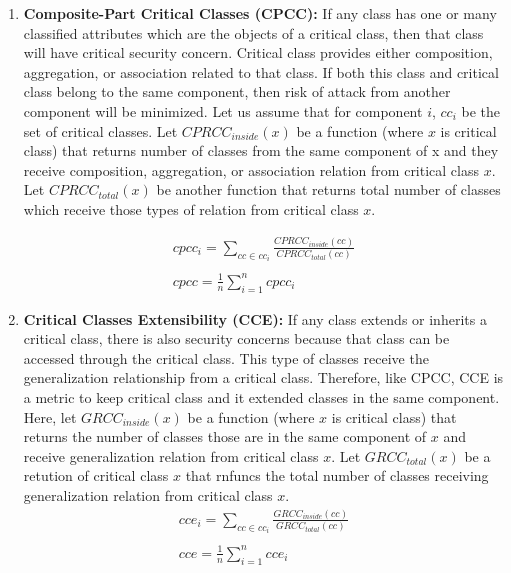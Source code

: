 \documentclass[letterpaper, 10 pt, conference]{ieeeconf}  %
\begin{document}
\begin{enumerate}
\item \textbf{Composite-Part Critical Classes (CPCC):} If any class has one or many classified attributes which are the objects of a critical class, then that class will have critical security concern. Critical class provides either composition, aggregation, or association related to that class. If both this class and critical class belong to the same component, then risk of attack from another component will be minimized. Let us assume that for component $i$, $cc_{i}$ be the set of critical classes. Let $CPRCC_{inside}(x)$ be a function (where $x$ is critical class) that returns number of classes from the same component of x and they receive composition, aggregation, or association relation from critical class $x$. Let
$CPRCC_{total}(x)$ be another function that returns total number of classes  which receive those types of relation from critical class $x$.

\begin{equation}\label{cpcc_eq}
\begin{array}{l}
cpcc_{i}=\sum_{cc \in cc_{i}}{\frac{CPRCC_{inside}(cc)}{CPRCC_{total}(cc)}}\\\\
cpcc=\frac{1}{n}\sum_{i=1}^{n}{cpcc_{i}}
\end{array}
\end{equation}

\item \textbf{Critical Classes Extensibility (CCE):} If any class extends or inherits a critical class,  there is also security concerns because that class can be accessed through the critical class. This type of classes receive the generalization relationship from a critical class. Therefore, like CPCC, CCE is a metric to keep critical class and it extended classes in the same component. 
Here, let $GRCC_{inside}(x)$ be a function (where $x$ is critical class) that returns  the number of classes those are in the same component of $x$ and  receive generalization relation from critical class $x$. Let $GRCC_{total}(x)$ be a retution of critical class $x$ that rnfuncs the total number of classes receiving generalization relation from critical class $x$.
\begin{equation}\label{cce_eq}
\begin{array}{l}
cce_{i}=\sum_{cc \in cc_{i}}{\frac{GRCC_{inside}(cc)}{GRCC_{total}(cc)}}\\\\
cce=\frac{1}{n}\sum_{i=1}^{n}{cce_{i}}
\end{array}
\end{equation}


\end{enumerate}
\end{document}
